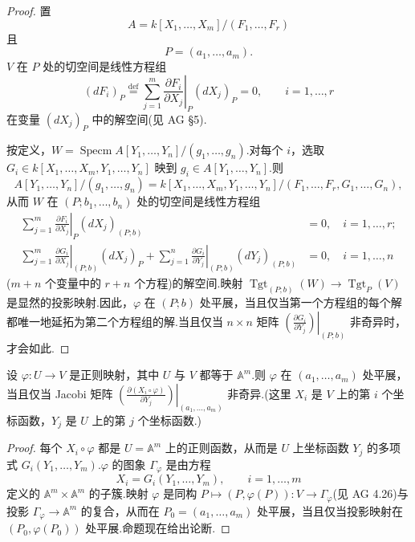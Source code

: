 \begin{proof}
置
\[
A = k[X_1, \ldots, X_m]/(F_1, \ldots, F_r)
\]
且
\[
P = (a_1, \ldots, a_m).
\]
$V$ 在 $P$ 处的切空间是线性方程组
\[
(dF_i)_{P} \overset{\mathrm{def}}{=} \sum_{j=1}^{m} \left.\frac{\partial F_i}{\partial X_j}\right|_{P} (dX_j)_{P} = 0, \qquad i = 1, \ldots, r
\]
在变量 $(dX_j)_{P}$ 中的解空间(见 AG \S 5).

按定义，$W = \operatorname{Specm} A[Y_1, \ldots, Y_n]/(g_1, \ldots, g_n)$.对每个 $i$，选取 $G_i \in k[X_1, \ldots, X_m, Y_1, \ldots, Y_n]$ 映到 $g_i \in A[Y_1, \ldots, Y_n]$.则
\[
A[Y_1, \ldots, Y_n]/(g_1, \ldots, g_n) = k[X_1, \ldots, X_m, Y_1, \ldots, Y_n]/(F_1, \ldots, F_r, G_1, \ldots, G_n),
\]
从而 $W$ 在 $(P; b_1, \ldots, b_n)$ 处的切空间是线性方程组
\begin{align*}
\sum_{j=1}^{m} \left.\frac{\partial F_i}{\partial X_j}\right|_{P} (dX_j)_{(P;b)} &= 0, \quad i = 1, \ldots, r; \\
\sum_{j=1}^{m} \left.\frac{\partial G_i}{\partial X_j}\right|_{(P;b)} (dX_j)_{P} + \sum_{j=1}^{n} \left.\frac{\partial G_i}{\partial Y_j}\right|_{(P;b)} (dY_j)_{(P;b)} &= 0, \quad i = 1, \ldots, n
\end{align*}
($m + n$ 个变量中的 $r + n$ 个方程)的解空间.映射 $\operatorname{Tgt}_{(P;b)}(W) \to \operatorname{Tgt}_{P}(V)$ 是显然的投影映射.因此，$\varphi$ 在 $(P; b)$ 处平展，当且仅当第一个方程组的每个解都唯一地延拓为第二个方程组的解.当且仅当 $n \times n$ 矩阵 $\left.\left(\frac{\partial G_i}{\partial Y_j}\right)\right|_{(P;b)}$ 非奇异时，才会如此.
\end{proof}

\begin{corollary}\label{cor:2.2}
设 $\varphi \colon U \to V$ 是正则映射，其中 $U$ 与 $V$ 都等于 $\mathbb{A}^{m}$.则 $\varphi$ 在 $(a_1, \ldots, a_m)$ 处平展，当且仅当 Jacobi 矩阵 $\left.\left(\frac{\partial (X_i \circ \varphi)}{\partial Y_j}\right)\right|_{(a_1, \ldots, a_m)}$ 非奇异.(这里 $X_i$ 是 $V$ 上的第 $i$ 个坐标函数，$Y_j$ 是 $U$ 上的第 $j$ 个坐标函数.)
\end{corollary}

\begin{proof}
每个 $X_i \circ \varphi$ 都是 $U = \mathbb{A}^{m}$ 上的正则函数，从而是 $U$ 上坐标函数 $Y_j$ 的多项式 $G_i(Y_1, \ldots, Y_m)$.$\varphi$ 的图象 $\Gamma_{\varphi}$ 是由方程
\[
X_i = G_i(Y_1, \ldots, Y_m), \qquad i = 1, \ldots, m
\]
定义的 $\mathbb{A}^{m} \times \mathbb{A}^{m}$ 的子簇.映射 $\varphi$ 是同构 $P \mapsto (P, \varphi(P)) \colon V \to \Gamma_{\varphi}$(见 AG 4.26)与投影 $\Gamma_{\varphi} \to \mathbb{A}^{m}$ 的复合，从而在 $P_0 = (a_1, \ldots, a_m)$ 处平展，当且仅当投影映射在 $(P_0, \varphi(P_0))$ 处平展.命题现在给出论断.
\end{proof}

